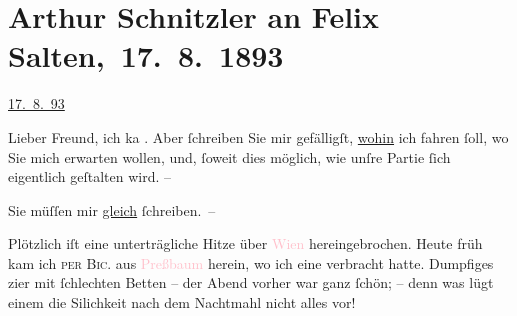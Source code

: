 

\renewcommand{\erwaehntePersonen}{Personen: Felix Salten, Josefine Lydia von Weisswasser}
\renewcommand{\erwaehnteOrte}{Orte: Dölsach, Pressbaum, Wien}
\renewcommand{\erwaehnteWerke}{}
\section[ Arthur Schnitzler an Felix Salten, 17. 8. 1893]{Arthur Schnitzler an Felix Salten, 17. 8. 1893}
\nopagebreak{}
\rehead{ }\normalsize\beginnumbering{}
\toendnotes[C]{\smallbreak\pagebreak[2]}
\toendnotes[C]{\smallbreak}
\pstart
           \raggedleft{}{\pb}\uline{17. 8. 93}\pend
           
\pstart{}Lieber Freund,\pend
\pstart
           ich ka{\geminationn}{ }\label{K_L02961-1v}\label{K_L02961-1h}. Aber ſchreiben Sie mir gefälligſt, \uline{wohin} ich
               fahren ſoll, wo Sie mich erwarten wollen, {\pb}und, ſoweit dies möglich, wie unſre Partie ſich eigentlich geſtalten wird. –\pend
           
\pstart
           Sie müſſen mir \uline{gleich} ſchreiben. –\pend
           
\pstart
           Plötzlich iſt eine unterträgliche Hitze über \textcolor{pink}{Wien}{}\ledrightnote{\textcolor{pink}{Wien}}
               hereingebrochen. {\pb}Heute{ }früh kam ich \textsc{per}{ }\textsc{Bic.} aus \textcolor{pink}{Preßbaum}{}\ledrightnote{\textcolor{pink}{Pressbaum}}
               herein, wo ich eine \label{K_L02961-2v}\label{K_L02961-2h} verbracht hatte. Dumpfiges \label{K_L02961-3v}\label{K_L02961-3h}zi{\geminationm}er mit ſchlechten Betten – der Abend
               vorher war ganz ſchön; – denn was lügt einem die Si{\geminationn}lichkeit nach dem {\pb}Nachtmahl \introOben{}nicht\introOben{} alles vor!\pend
           
